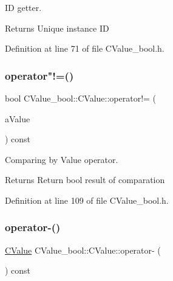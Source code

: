 ID getter. 

\begin{DoxyReturn}{Returns}
Unique instance ID 
\end{DoxyReturn}


Definition at line 71 of file C\+Value\+\_\+bool.\+h.

\mbox{\label{class_c_value__bool_1_1_c_value_ad77db9403e1e923b324aa919108609e6}} 
\subsubsection{\texorpdfstring{operator"!=()}{operator!=()}}
{\footnotesize\ttfamily bool C\+Value\+\_\+bool\+::\+C\+Value\+::operator!= (\begin{DoxyParamCaption}\item[{const \hyperlink{class_c_value__bool_1_1_c_value}{C\+Value} \&}]{a\+Value }\end{DoxyParamCaption}) const\hspace{0.3cm}{\ttfamily [inline]}}



Comparing by Value operator. 

\begin{DoxyReturn}{Returns}
Return {\ttfamily bool} result of comparation 
\end{DoxyReturn}


Definition at line 109 of file C\+Value\+\_\+bool.\+h.

\mbox{\label{class_c_value__bool_1_1_c_value_a6fe95b37e5928d4ea12b8bfcdafc0027}} 
\subsubsection{\texorpdfstring{operator-\/()}{operator-()}}
{\footnotesize\ttfamily \hyperlink{class_c_value__bool_1_1_c_value}{C\+Value} C\+Value\+\_\+bool\+::\+C\+Value\+::operator-\/ (\begin{DoxyParamCaption}{ }\end{DoxyParamCaption}) const\hspace{0.3cm}{\ttfamily [inline]}}



